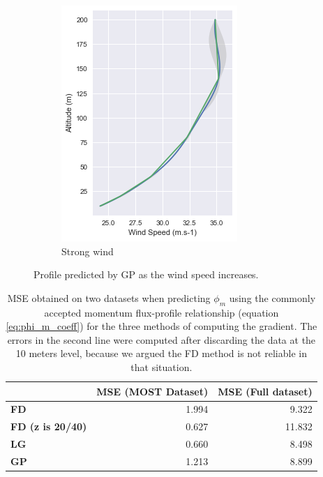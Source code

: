 \documentclass[a4paper,11pt]{kth-mag}
\begin{document}
\begin{figure}
\begin{subfigure}[t]{0.32\textwidth}
        \includegraphics[width=\textwidth]{images/gp_strong_wind}
        \caption{Strong wind}
        \label{fig:gp_strong_wind}
    \end{subfigure}
    \caption{Profile predicted by GP as the wind speed increases.}
	\label{fig:gp_profile}
\end{figure}


\begin{table}[]
\centering
\caption{MSE obtained on two datasets when predicting $\phi_m$ using the commonly accepted momentum flux-profile relationship (equation \ref{eq:phi_m_coeff}) for the three methods of computing the gradient. The errors in the second line were computed after discarding the data at the 10 meters level, because we argued the FD method is not reliable in that situation.}
\label{tbl:gradient_errors}
\begin{tabular}{l|r|r}
\toprule
& \textbf{MSE (MOST Dataset) } &\textbf{ MSE (Full dataset) }\\
\midrule
\textbf{FD} & 1.994 & 9.322 \\
\textbf{FD (z is 20/40) } & 0.627  & 11.832 \\
\textbf{LG } & 0.660 & 8.498 \\
\textbf{GP} & 1.213 & 8.899 \\
\bottomrule
\end{tabular}
\end{table}
\end{document}
